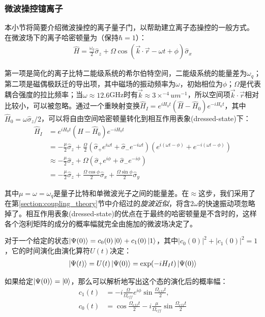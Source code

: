 \subsubsection[微波操控镱离子]{微波操控镱离子\label{section:microwave_operation}}
本小节将简要介绍微波操控的离子量子门，以帮助建立离子态操控的一般方式。
在微波场下的离子哈密顿量为（保持$\hbar=1$）：
\begin{align}
    \hat{H}=\frac{\omega_q}{2}\hat{\sigma}_z + \Omega\cos\left(\vec{k}\cdot\vec{r}-\omega t + \phi\right)\hat{\sigma}_x
\end{align}

第一项是简化的离子比特二能级系统的希尔伯特空间，二能级系统的能量差为$\omega_q$；第二项是磁偶极跃迁的导出项，其中磁场的振动频率为$\omega$，初始相位为$\phi$；$\Omega$是代表耦合强度的拉比频率；当$\omega\approx 12.6$GHz时有$\vec{k}\approx3\times ^{-4}um^{-1}$，所以空间项$\vec{k}\cdot \vec{r}$相对比较小，可以被忽略。通过一个重映射变换$\hat{H}_I=e^{iH_0t}(\hat{H}-\hat{H}_0)e^{-iH_0t}$，其中$\hat{H}_0=\omega\hat{\sigma}_z/2$，可以将自由空间哈密顿量转化到相互作用表象(dressed-state)下：
\begin{align}
    \hat{H}_I&=e^{iH_0t}(\hat{H}-\hat{H}_0)e^{-iH_0t}\\
    &=-\frac{\mu}{2}\hat{\sigma}_z+\frac{\Omega}{2}\left(\hat{\sigma}_+e^{i\omega t}+\hat{\sigma}_-e^{-i\omega t}\right)\left(e^{i(\omega t-\phi)}+e^{-i(\omega t-\phi)}\right)\\
    &\approx -\frac{\mu}{2}\hat{\sigma}_z+\Omega(\hat{\sigma}_+e^{i\phi}+\hat{\sigma}_-e^{-i\phi})\\
    &=-\frac{\mu}{2}\hat{\sigma}_z+\frac{\Omega\cos{\phi}}{2}\hat{\sigma}_x+\frac{\Omega\sin{\phi}}{2}\hat{\sigma}_y\label{eq:interaction_hamiltonian_microwave}
\end{align}

其中$\mu=\omega=\omega_q$是量子比特和单微波光子之间的能量差。在$\approx$这步，我们采用了在第\ref{section:coupling_theory}节中介绍过的\emph{旋波近似}，将含$2\omega$的快速振动项忽略掉了。相互作用表象(dressed-state)的优点在于最终的哈密顿量是不含时的，这样各个泡利矩阵的成分的概率幅就完全由施加的微波场决定了。

对于一个给定的状态$\ket{\Psi(0)}=c_0(0)\ket{0}+c_1(0)\ket{1}$，其中$|c_0(0)|^2+|c_1(0)|^2=1$，它的时间演化由演化算符$U(t)$决定：
\begin{align}
    \ket{\Psi(t)}=U(t)\ket{\Psi(0)}=\exp(-iH_It)\ket{\Psi(0)}
\end{align}

如果给定$\ket{\Psi(0)}=\ket{0}$，那么可以解析地写出这个态的演化后的概率幅：
\begin{align}
    c_1(t)&=-i\frac{\Omega}{\Omega_{eff}}e^{i\phi}\sin{\frac{\Omega_{eff}t}{2}},\\
    c_0(t)&=\cos{\frac{\Omega_{eff}t}{2}}-i\frac{\mu}{\Omega_{eff}}\sin{\frac{\Omega_{eff}t}{2}}
\end{align}

